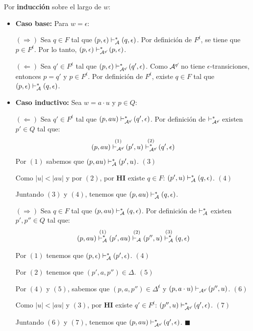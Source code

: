 Por \textbf{inducción} sobre el largo de $w$:
\begin{itemize}
    \item \textbf{Caso base:} Para $w = \epsilon$:

          $(\Rightarrow)$ Sea $q \in F$ tal que $(p, \epsilon) \vdash_{\mathcal{A}}^* (q, \epsilon)$. Por definición de $F^{\not\epsilon}$, se tiene que $p \in F^{\not\epsilon}$. Por lo tanto, $(p,\epsilon) \vdash_{\mathcal{A}^{\not\epsilon}}^* (p, \epsilon)$.

          $(\Leftarrow)$ Sea $q' \in F^{\not\epsilon}$ tal que $(p, \epsilon) \vdash_{\mathcal{A}^{\not\epsilon}}^* (q', \epsilon)$. Como $\mathcal{A}^{\not\epsilon}$ no tiene $\epsilon$-transiciones, entonces $p = q'$ y $p \in F^{\not\epsilon}$. Por definición de $F^{\not\epsilon}$, existe $q \in F$ tal que $(p, \epsilon) \vdash_{\mathcal{A}}^* (q, \epsilon)$.

    \item \textbf{Caso inductivo:} Sea $w = a\cdot u$ y $p \in Q$:

          $(\Leftarrow)$ Sea $q' \in F^{\not\epsilon}$ tal que $(p, au) \vdash_{\mathcal{A}^{\not\epsilon}}^* (q', \epsilon)$. Por definición de $\vdash_{\mathcal{A}^{\not\epsilon}}^*$ existen $p' \in Q$ tal que:
          $$
              (p, au) \overset{(1)}{\vdash_{\mathcal{A}^{\not\epsilon}}} (p', u) \overset{(2)}{\vdash_{\mathcal{A}^{\not\epsilon}}^*} (q', \epsilon)
          $$
          Por $(1)$ sabemos que $(p,au) \vdash_{\mathcal{A}}^* (p', u)$. \hfill $(3)$

          Como $|u| < |au|$ y por $(2)$, por \textbf{HI} existe $q \in F$: $(p', u) \vdash_{\mathcal{A}}^* (q, \epsilon)$. \hfill $(4)$

          Juntando $(3)$ y $(4)$, tenemos que $(p,au) \vdash_{\mathcal{A}}^* (q,\epsilon)$.

          $(\Rightarrow)$ Sea $q \in F$ tal que $(p,au) \vdash_{\mathcal{A}}^* (q, \epsilon)$. Por definición de $\vdash_{\mathcal{A}}^*$ existen $p',p'' \in Q$ tal que:
          $$
              (p, au) \overset{(1)}{\vdash_{\mathcal{A}}^*} (p', au) \overset{(2)}{\vdash_{\mathcal{A}}} (p'', u) \overset{(3)}{\vdash_{\mathcal{A}}^*} (q, \epsilon)
          $$

          Por $(1)$ tenemos que $(p, \epsilon) \vdash_{\mathcal{A}}^* (p', \epsilon)$. \hfill $(4)$

          Por $(2)$ tenemos que $(p', a, p'') \in \Delta.$ \hfill $(5)$

          Por $(4)$ y $(5)$, sabemos que $(p, a, p'') \in \Delta^{\not\epsilon}$ y $(p, a \cdot u) \vdash_{\mathcal{A}^{\not\epsilon}} (p'', u)$. \hfill $(6)$

          Como $|u| < |au|$ y $(3)$, por \textbf{HI} existe $q' \in F^{\not\epsilon}$: $(p'', u) \vdash_{\mathcal{A}^{\not\epsilon}}^* (q', \epsilon)$. \hfill $(7)$

          Juntando $(6)$ y $(7)$, tenemos que $(p, au) \vdash_{\mathcal{A}^{\not\epsilon}}^* (q', \epsilon)$. \hfill $\blacksquare$
\end{itemize}

